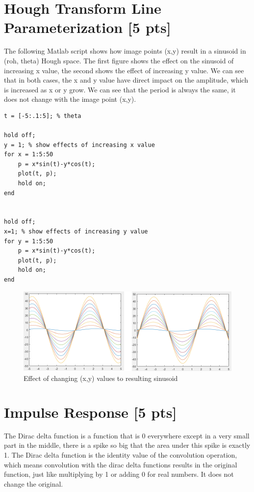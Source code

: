 \documentclass[12pt,a4paper]{article}
\begin{document}
\section{Hough Transform Line Parameterization [5 pts]}

The following Matlab script shows how image points (x,y) result in a sinusoid in (roh, theta) Hough space. The first figure shows the effect on the sinusoid of increasing x value, the second shows the effect of increasing y value.
We can see that in both cases, the x and y value have direct impact on the amplitude, which is increased as x or y grow.
We can see that the period is always the same, it does not change with the image point (x,y).

\begin{lstlisting}
t = [-5:.1:5]; % theta

hold off;
y = 1; % show effects of increasing x value
for x = 1:5:50
    p = x*sin(t)-y*cos(t);
    plot(t, p);
    hold on;
end


hold off;
x=1; % show effects of increasing y value
for y = 1:5:50
    p = x*sin(t)-y*cos(t);
    plot(t, p);
    hold on;
end
\end{lstlisting}


\begin{figure}[!h]
    \begin{center}
        \includegraphics[width=1.0\textwidth]{assets/ht.PNG}
        \caption{Effect of changing (x,y) values to resulting sinusoid}
        \label{fig:hough_transform}
    \end{center}
\end{figure}


\section{Impulse Response [5 pts]}
The Dirac delta function is a function that is 0 everywhere except in a very small part in the middle, there is a spike so big that the area under this spike is exactly 1.
The Dirac delta function is the identity value of the convolution operation, which means convolution with the dirac delta functions results in the original function, just like multiplying by 1 or adding 0 for real numbers. It does not change the original.
\end{document}
